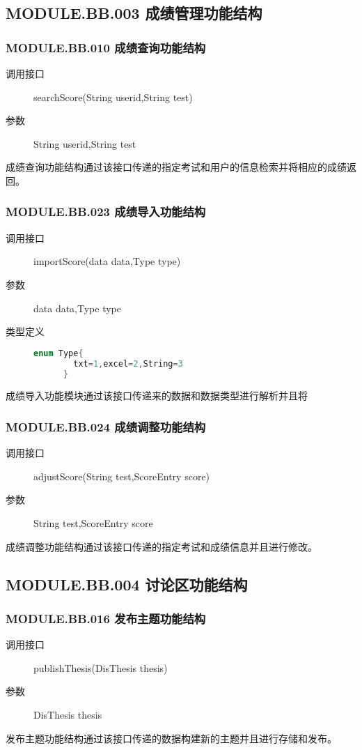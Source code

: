 \subsection{MODULE.BB.003 成绩管理功能结构}
  \subsubsection{MODULE.BB.010 成绩查询功能结构}
  \begin{description}
    \item[调用接口]searchScore(String userid,String test)
    \item[参数]String userid,String test
  \end{description}
  成绩查询功能结构通过该接口传递的指定考试和用户的信息检索并将相应的成绩返回。
  \subsubsection{MODULE.BB.023 成绩导入功能结构}
  \begin{description}
    \item[调用接口]importScore(data data,Type type)
    \item[参数]data data,Type type
    \item[类型定义]
    \begin{lstlisting}[language=C]
      enum Type{
        txt=1,excel=2,String=3
      }
    \end{lstlisting}
  \end{description}
  成绩导入功能模块通过该接口传递来的数据和数据类型进行解析并且将
  \subsubsection{MODULE.BB.024 成绩调整功能结构}
  \begin{description}
    \item[调用接口]adjustScore(String test,ScoreEntry score)
    \item[参数]String test,ScoreEntry score
  \end{description}
  成绩调整功能结构通过该接口传递的指定考试和成绩信息并且进行修改。

\subsection{MODULE.BB.004 讨论区功能结构}
  \subsubsection{MODULE.BB.016 发布主题功能结构}
  \begin{description}
    \item[调用接口]publishThesis(DisThesis thesis)
    \item[参数]DisThesis thesis
  \end{description}
  发布主题功能结构通过该接口传递的数据构建新的主题并且进行存储和发布。
